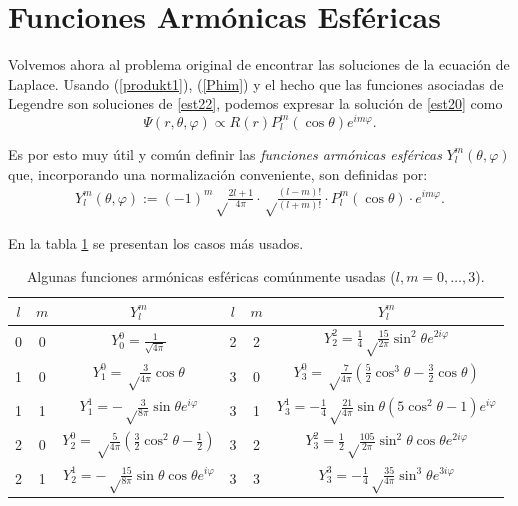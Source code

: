 \section{Funciones Armónicas Esféricas}

 Volvemos ahora al problema original de encontrar las soluciones de la ecuación
de Laplace. Usando (\ref{produkt1}), (\ref{Phim}) y el hecho que las funciones asociadas de Legendre son soluciones de \eqref{est22}, podemos expresar la solución de \eqref{est20} como
 \begin{equation}
\Psi(r,\theta,\varphi)\propto R(r)P_l^m(\cos\theta)e^{im\varphi}.\label{est30}
 \end{equation}
\begin{tcolorbox}
Es por esto muy útil y común definir las \textit{funciones armónicas
esféricas} $Y_l^m (\theta,\varphi)$ que, incorporando una normalización conveniente, son definidas por:
 \begin{eqnarray}
  Y_l^m (\theta,\varphi) := (-1)^m\sqrt\frac{2l+1}{4\pi}\cdot\sqrt\frac
   {(l-m)!}{(l+m)!}\cdot P_l^m(\cos\theta)\cdot e^{im\varphi}.\label{kugel1}
 \end{eqnarray}
\end{tcolorbox}
  En la tabla \ref{tabelle1} se presentan los casos más usados.
\begin{table}[htbp]
\begin{tabular}{cc|c||cc|c}
  $l$ & $m$ & $Y_l^m $ & $l$ & $m$ & $Y_l^m $\\\hline
  0&0&$Y_0^0=\frac 1{\sqrt{4\pi}}$&2&2&$Y_2^2=\frac 14\sqrt\frac{15}{2\pi}
   \sin^2\theta e^{2i\varphi}$\\
  1&0&$Y_1^0=\sqrt\frac 3{4\pi}\cos\theta$&3&0&$Y_3^0=\sqrt\frac 7{4\pi}
  (\frac 52\cos^3\theta-\frac 32\cos\theta)$\\
  1&1&$Y_1^1=-\sqrt \frac 3{8\pi}\sin\theta e^{i\varphi}$&3&1&$Y_3^1=
  -\frac 14\sqrt\frac{21}{4\pi}\sin\theta(5\cos^2\theta-1)e^{i\varphi}$\\
  2&0&$Y_2^0=\sqrt\frac 5{4\pi}(\frac 32\cos^2\theta-\frac 12)$&3&2&$Y_3^2=
  \frac 12\sqrt\frac{105}{2\pi}\sin^2\theta\cos\theta e^{2i\varphi}$\\
  2&1&$Y_2^1=-\sqrt\frac{15}{8\pi}\sin\theta\cos\theta e^{i\varphi}$&3&3&$
  Y_3^3=-\frac 14\sqrt\frac{35}{4\pi}\sin^3\theta e^{3i\varphi}$
 \end{tabular}
\caption{Algunas funciones armónicas esféricas comúnmente usadas
($l,m=0,\ldots,3$).}
\label{tabelle1}
\end{table}

